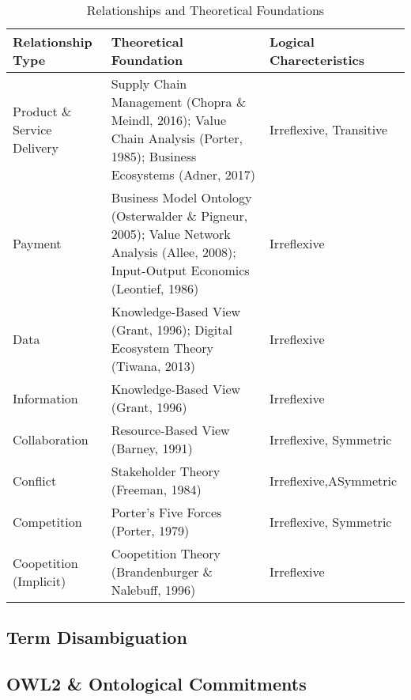 \documentclass[runningheads]{llncs}
\begin{document}
\begin{table}[ht]
    \centering
    \caption{Relationships and Theoretical Foundations}
    \label{tab:relationships}
    \begin{tabularx}{\textwidth}{lYY}
    \toprule
    \textbf{Relationship Type} & \textbf{Theoretical Foundation} & \textbf{Logical Charecteristics} \\
    \midrule
    Product \& Service Delivery & 
    Supply Chain Management (Chopra \& Meindl, 2016); 
    Value Chain Analysis (Porter, 1985); 
    Business Ecosystems (Adner, 2017) & 
    Irreflexive, Transitive \\
    \addlinespace
    
    Payment & 
    Business Model Ontology (Osterwalder \& Pigneur, 2005); 
    Value Network Analysis (Allee, 2008); 
    Input-Output Economics (Leontief, 1986) & 
    Irreflexive \\
    \addlinespace
    
    Data & 
    Knowledge-Based View (Grant, 1996); 
    Digital Ecosystem Theory (Tiwana, 2013) &
    Irreflexive \\
    \addlinespace
    
    Information & 
    Knowledge-Based View (Grant, 1996) & 
    Irreflexive \\
    \addlinespace
    
    Collaboration & 
    Resource-Based View (Barney, 1991) & 
    Irreflexive, Symmetric \\
    \addlinespace
    
    Conflict & 
    Stakeholder Theory (Freeman, 1984) & 
    Irreflexive,ASymmetric \\
    \addlinespace
    
    Competition & 
    Porter's Five Forces (Porter, 1979) & 
    Irreflexive, Symmetric \\
    \addlinespace
    
    Coopetition (Implicit) & 
    Coopetition Theory (Brandenburger \& Nalebuff, 1996) & 
    Irreflexive \\
    \bottomrule
    \end{tabularx}
    \smallskip
    \end{table}

\subsection{Term Disambiguation}

\subsection{OWL2 \& Ontological Commitments}
\end{document}

